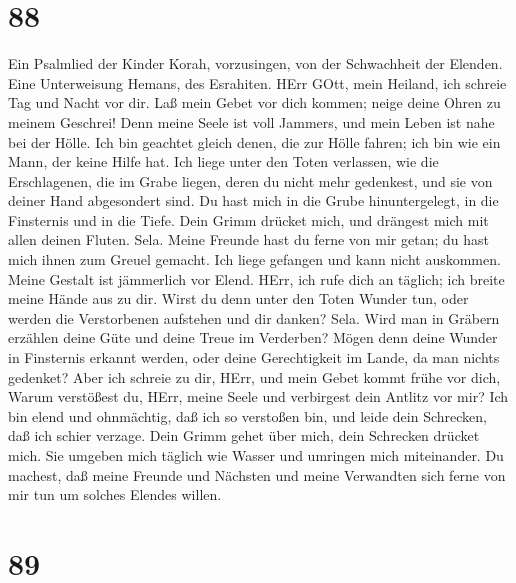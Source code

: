 \hypertarget{section-87}{%
\section{88}\label{section-87}}

 Ein Psalmlied der Kinder Korah, vorzusingen, von der
Schwachheit der Elenden. Eine Unterweisung Hemans, des Esrahiten.
 HErr GOtt, mein Heiland, ich schreie Tag und Nacht vor dir.
 Laß mein Gebet vor dich kommen; neige deine Ohren zu meinem
Geschrei!  Denn meine Seele ist voll Jammers, und mein Leben
ist nahe bei der Hölle.  Ich bin geachtet gleich denen, die
zur Hölle fahren; ich bin wie ein Mann, der keine Hilfe hat.
 Ich liege unter den Toten verlassen, wie die Erschlagenen,
die im Grabe liegen, deren du nicht mehr gedenkest, und sie von deiner
Hand abgesondert sind.  Du hast mich in die Grube
hinuntergelegt, in die Finsternis und in die Tiefe.  Dein
Grimm drücket mich, und drängest mich mit allen deinen Fluten. Sela.
 Meine Freunde hast du ferne von mir getan; du hast mich
ihnen zum Greuel gemacht. Ich liege gefangen und kann nicht auskommen.
 Meine Gestalt ist jämmerlich vor Elend. HErr, ich rufe
dich an täglich; ich breite meine Hände aus zu dir.  Wirst
du denn unter den Toten Wunder tun, oder werden die Verstorbenen
aufstehen und dir danken? Sela.  Wird man in Gräbern
erzählen deine Güte und deine Treue im Verderben?  Mögen
denn deine Wunder in Finsternis erkannt werden, oder deine Gerechtigkeit
im Lande, da man nichts gedenket?  Aber ich schreie zu dir,
HErr, und mein Gebet kommt frühe vor dich,  Warum
verstößest du, HErr, meine Seele und verbirgest dein Antlitz vor mir?
 Ich bin elend und ohnmächtig, daß ich so verstoßen bin,
und leide dein Schrecken, daß ich schier verzage.  Dein
Grimm gehet über mich, dein Schrecken drücket mich.  Sie
umgeben mich täglich wie Wasser und umringen mich miteinander.
 Du machest, daß meine Freunde und Nächsten und meine
Verwandten sich ferne von mir tun um solches Elendes willen.

\hypertarget{section-88}{%
\section{89}\label{section-88}}

